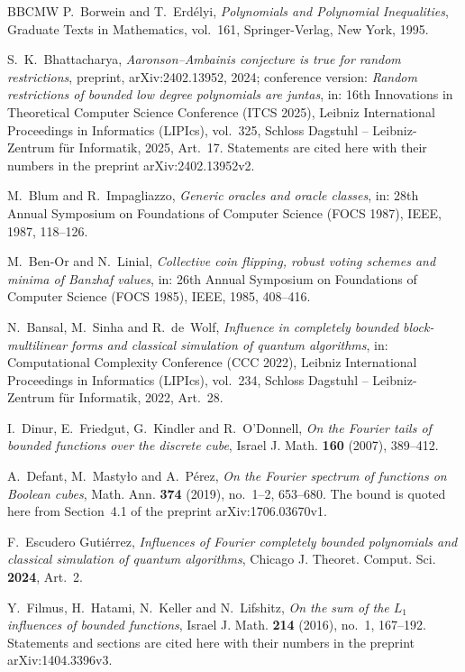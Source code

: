\documentclass[11pt,reqno]{amsart}
\theoremstyle{definition}
\theoremstyle{remark}
\numberwithin{equation}{section}
\theoremstyle{named}
\theoremstyle{plain}
\begin{document}
\begin{thebibliography}{BBCMW}
 P.~Borwein and T.~Erd\'elyi, \emph{Polynomials and Polynomial Inequalities}, Graduate
Texts in Mathematics, vol.~161, Springer-Verlag, New York, 1995.

 S.~K.~Bhattacharya, \emph{Aaronson--Ambainis conjecture is true for random
restrictions}, preprint, arXiv:2402.13952, 2024; conference version: \emph{Random restrictions of
bounded low degree polynomials are juntas}, in: 16th Innovations in Theoretical Computer Science
Conference (ITCS 2025), Leibniz International Proceedings in Informatics (LIPIcs), vol.~325,
Schloss Dagstuhl -- Leibniz-Zentrum f\"ur Informatik, 2025, Art.~17. Statements are cited here with
their numbers in the preprint arXiv:2402.13952v2.

 M.~Blum and R.~Impagliazzo, \emph{Generic oracles and oracle classes}, in: 28th
Annual Symposium on Foundations of Computer Science (FOCS 1987), IEEE, 1987, 118--126.

 M.~Ben-Or and N.~Linial, \emph{Collective coin flipping, robust voting schemes and
minima of Banzhaf values}, in: 26th Annual Symposium on Foundations of Computer Science (FOCS 1985),
IEEE, 1985, 408--416.

 N.~Bansal, M.~Sinha and R.~de~Wolf, \emph{Influence in completely bounded
block-multilinear forms and classical simulation of quantum algorithms}, in: Computational Complexity
Conference (CCC 2022), Leibniz International Proceedings in Informatics (LIPIcs), vol.~234, Schloss
Dagstuhl -- Leibniz-Zentrum f\"ur Informatik, 2022, Art.~28.

 I.~Dinur, E.~Friedgut, G.~Kindler and R.~O'Donnell, \emph{On the Fourier tails of
bounded functions over the discrete cube}, Israel J. Math. \textbf{160} (2007), 389--412.

 A.~Defant, M.~Masty{\l}o and A.~P\'erez, \emph{On the Fourier spectrum of functions
on Boolean cubes}, Math. Ann. \textbf{374} (2019), no.~1--2, 653--680. The bound is quoted here from
Section~4.1 of the preprint arXiv:1706.03670v1.

 F.~Escudero Guti\'errez, \emph{Influences of Fourier completely bounded polynomials
and classical simulation of quantum algorithms}, Chicago J. Theoret. Comput. Sci. \textbf{2024},
Art.~2.

 Y.~Filmus, H.~Hatami, N.~Keller and N.~Lifshitz, \emph{On the sum of the $L_1$
influences of bounded functions}, Israel J. Math. \textbf{214} (2016), no.~1, 167--192. Statements
and sections are cited here with their numbers in the preprint arXiv:1404.3396v3.


\end{thebibliography}
\end{document}
